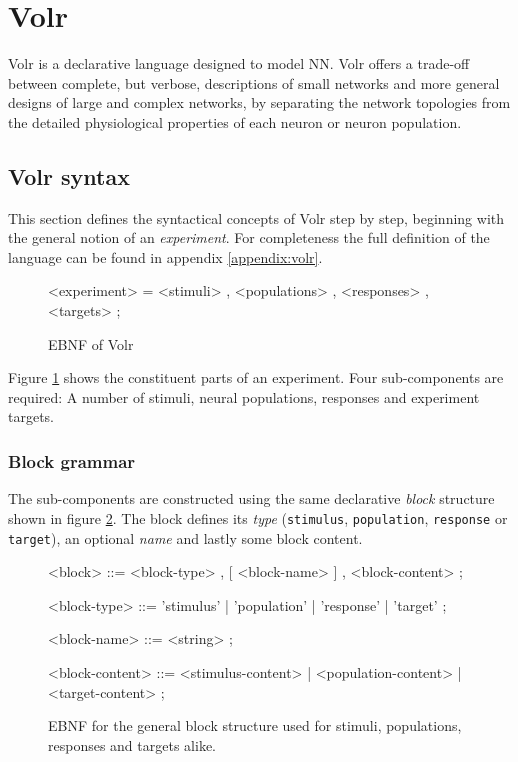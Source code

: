 \section{Volr}
Volr is a declarative language designed to model \gls{NN}.
Volr offers a trade-off between complete, but verbose, descriptions of small
networks and more general designs of large and complex networks, by separating
the network topologies from the detailed physiological properties of each
neuron or neuron population.

\subsection{Volr syntax}
This section defines the syntactical concepts of Volr step by step, beginning
with the general notion of an \textit{experiment}. For completeness the full
definition of the language can be found in appendix \ref{appendix:volr}.

\begin{figure}
  \label{fig:volr-ebnf}
  \begin{minipage}{0.9\linewidth}
    \begin{grammar}
      <experiment> = <stimuli> , <populations> , <responses> , <targets> ;
    \end{grammar}
  \end{minipage}
  \caption{EBNF of Volr}
\end{figure}

Figure \ref{fig:volr-ebnf} shows the constituent parts of an experiment.
Four sub-components are required:
  A number of stimuli, neural populations, responses and experiment targets.

\subsubsection{Block grammar}
The sub-components are constructed using the same declarative \textit{block}
structure shown in figure \ref{fig:volr-ebnf-block}.
The block defines its \textit{type} (\texttt{stimulus}, \texttt{population},
\texttt{response} or \texttt{target}), an optional \textit{name} and lastly
some block content.

\begin{figure}
  \label{fig:volr-ebnf-block}
  \begin{grammar}
    <block> ::= <block-type> , [ <block-name> ] , { <block-content> } ;

    <block-type> ::= 'stimulus' | 'population' | 'response' | 'target' ;

    <block-name> ::= <string> ;

    <block-content> ::= <stimulus-content> | <population-content>
     | <target-content> ;
  \end{grammar}
  \caption{EBNF for the general block structure used for stimuli, populations,
    responses and targets alike.}
\end{figure}

